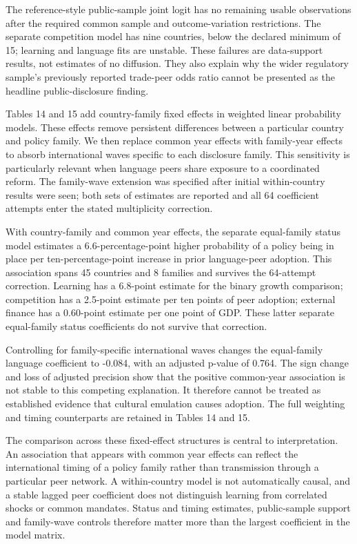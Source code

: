 \documentclass[12pt,letterpaper]{article}
\begin{document}
The reference-style public-sample joint logit has no remaining usable observations after the required common sample and outcome-variation restrictions. The separate competition model has nine countries, below the declared minimum of 15; learning and language fits are unstable. These failures are data-support results, not estimates of no diffusion. They also explain why the wider regulatory sample's previously reported trade-peer odds ratio cannot be presented as the headline public-disclosure finding.


Tables 14 and 15 add country-family fixed effects in weighted linear probability models. These effects remove persistent differences between a particular country and policy family. We then replace common year effects with family-year effects to absorb international waves specific to each disclosure family. This sensitivity is particularly relevant when language peers share exposure to a coordinated reform. The family-wave extension was specified after initial within-country results were seen; both sets of estimates are reported and all 64 coefficient attempts enter the stated multiplicity correction.


With country-family and common year effects, the separate equal-family status model estimates a 6.6-percentage-point higher probability of a policy being in place per ten-percentage-point increase in prior language-peer adoption. This association spans 45 countries and 8 families and survives the 64-attempt correction. Learning has a 6.8-point estimate for the binary growth comparison; competition has a 2.5-point estimate per ten points of peer adoption; external finance has a 0.60-point estimate per one point of GDP. These latter separate equal-family status coefficients do not survive that correction.


Controlling for family-specific international waves changes the equal-family language coefficient to -0.084, with an adjusted p-value of 0.764. The sign change and loss of adjusted precision show that the positive common-year association is not stable to this competing explanation. It therefore cannot be treated as established evidence that cultural emulation causes adoption. The full weighting and timing counterparts are retained in Tables 14 and 15.


The comparison across these fixed-effect structures is central to interpretation. An association that appears with common year effects can reflect the international timing of a policy family rather than transmission through a particular peer network. A within-country model is not automatically causal, and a stable lagged peer coefficient does not distinguish learning from correlated shocks or common mandates. Status and timing estimates, public-sample support and family-wave controls therefore matter more than the largest coefficient in the model matrix.
\end{document}
